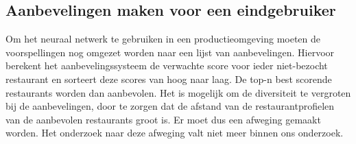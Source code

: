 \subsection*{Aanbevelingen maken voor een eindgebruiker}
Om het neuraal netwerk te gebruiken in een productieomgeving moeten de voorspellingen nog omgezet worden naar een lijst van aanbevelingen. Hiervoor berekent het aanbevelingssysteem de verwachte score voor ieder niet-bezocht restaurant en sorteert deze scores van hoog naar laag. De top-n best scorende restaurants worden dan aanbevolen. Het is mogelijk om de diversiteit te vergroten bij de aanbevelingen, door te zorgen dat de afstand van de restaurantprofielen van de aanbevolen restaurants groot is. Er moet dus een afweging gemaakt worden. Het onderzoek naar deze afweging valt niet meer binnen ons onderzoek.


